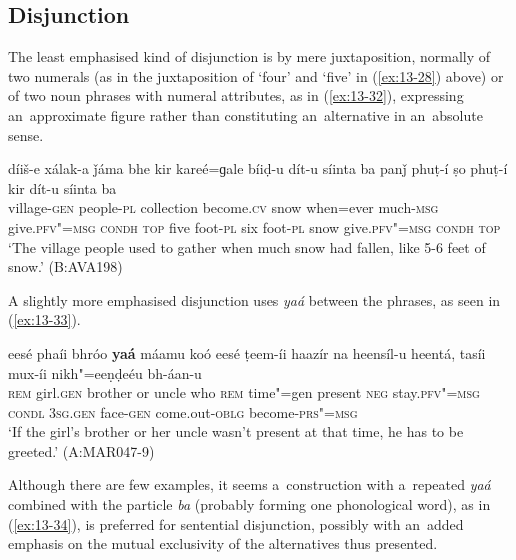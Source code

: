 \subsection{Disjunction}
\label{subsec:13-2-3}

 The least emphasised kind of disjunction is by mere juxtaposition, normally of two numerals (as in the juxtaposition of `four' and `five' in (\ref{ex:13-28}) above) or of two noun phrases with numeral attributes, as in (\ref{ex:13-32}), expressing an~approximate figure rather than constituting an~alternative in an~absolute sense.

\begin{exe}
\ex
\label{ex:13-32}
\gll díiš-e xálak-a ǰáma bhe kir kareé=ɡale bíiḍ-u dít-u síinta ba {\ob}panǰ phuṭ-í ṣo phuṭ-í{\cb} kir dít-u síinta ba\\
village-\textsc{gen} people-\textsc{pl} collection become.\textsc{cv} snow  when=ever much-\textsc{msg} give.\textsc{pfv"=msg} \textsc{condh} \textsc{top} five  foot-\textsc{pl} six foot-\textsc{pl} snow give.\textsc{pfv"=msg} \textsc{condh} \textsc{top} \\
\glt `The village people used to gather when much snow had fallen, like 5-6 feet of snow.' (B:AVA198) 
\end{exe}

 A slightly more emphasised disjunction uses \textit{yaá} between the phrases, as seen in (\ref{ex:13-33}).

\ea
\label{ex:13-33}
\gll eesé phaíi {\ob}bhróo \textbf{yaá} máamu{\cb} koó eesé ṭeem-íi haazír na heensíl-u heentá, tasíi mux-íi nikh"=eeṇḍeéu bh-áan-u \\
\textsc{rem} girl.\textsc{gen} brother or uncle who \textsc{rem} time"=gen  present \textsc{neg} stay.\textsc{pfv"=msg} \textsc{condl} \textsc{3sg.gen} face-\textsc{gen}  come.out-\textsc{oblg} become-\textsc{prs"=msg}  \\
\glt `If the girl's brother or her uncle wasn't present at that time, he has to be greeted.' (A:MAR047-9) 
\z

 Although there are few examples, it seems a~construction with a~repeated \textit{yaá} combined with the particle \textit{ba} (probably forming one phonological word), as in (\ref{ex:13-34}), is preferred for sentential disjunction, possibly with an~added emphasis on the mutual exclusivity of the alternatives thus presented. 

